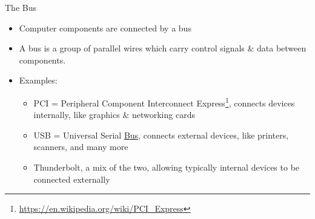 \documentclass[graphics]{beamer}
\begin{document}
\begin{frame}{The Bus}
    \begin{itemize}
        \item Computer components are connected by a bus
        \item A bus is a group of parallel wires which carry control signals \& data between components.
        \item Examples:
        \begin{itemize}
            \item PCI = Peripheral Component Interconnect Express\footnote{\url{https://en.wikipedia.org/wiki/PCI_Express}}, connects devices internally, like graphics \& networking cards
            \item USB = Universal Serial \underline{Bus}, connects external devices, like printers, scanners, and many more
            \item Thunderbolt, a mix of the two, allowing typically internal devices to be connected externally
        \end{itemize}
    \end{itemize}
\end{frame}
\end{document}
